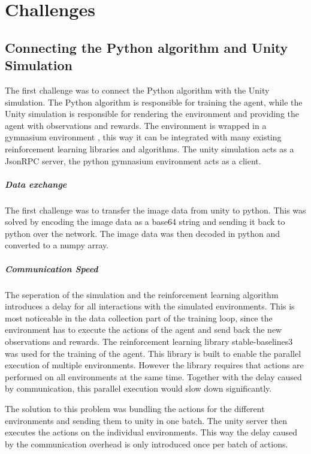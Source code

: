 \chapter{Challenges}
\label{cha:challenges}

\section{Connecting the Python algorithm and Unity Simulation}

The first challenge was to connect the Python algorithm with the Unity simulation. The Python algorithm is responsible for training the agent, while the Unity simulation is responsible for rendering the environment and providing the agent with observations and rewards. The environment is wrapped in a gymnasium environment \autocite{gymnasium}, this way it can be integrated with many existing reinforcement learning libraries and algorithms. The unity simulation acts as a JsonRPC server, the python gymnasium environment acts as a client. 

\paragraph{Data exchange}
The first challenge was to transfer the image data from unity to python. This was solved by encoding the image data as a base64 string and sending it back to python over the network. The image data was then decoded in python and converted to a numpy array.

\paragraph{Communication Speed}
The seperation of the simulation and the reinforcement learning algorithm introduces a delay for all interactions with the simulated environments. This is most noticeable in the data collection part of the training loop, since the environment has to execute the actions of the agent and send back the new observations and rewards. 
The reinforcement learning library stable-baselines3 \autocite{sb3} was used for the training of the agent. This library is built to enable the parallel execution of multiple environments. However the library requires that actions are performed on all environments at the same time. Together with the delay caused by communication, this parallel execution would slow down significantly.

The solution to this problem was bundling the actions for the different environments and sending them to unity in one batch. The unity server then executes the actions on the individual environments. This way the delay caused by the communication overhead is only introduced once per batch of actions.

